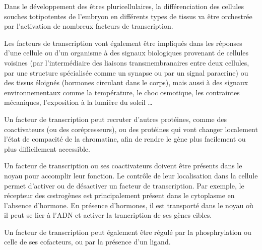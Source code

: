 \documentclass{report}
\begin{document}
Dans le développement des êtres pluricellulaires, la différenciation des cellules souches totipotentes de l'embryon en différents types de tissus va être orchestrée par l'activation de nombreux facteurs de transcription. 

Les facteurs de transcription vont également être impliqués dans les réponses d'une cellule ou d'un organisme à des signaux biologiques provenant de cellules voisines (par l'intermédiaire des liaisons transmembranaires entre deux cellules, par une structure spécialisée comme un synapse ou par un signal paracrine) ou des tissus éloignés (hormones circulant dans le corps), mais aussi à des signaux environnementaux comme la température, le choc osmotique, les contraintes mécaniques, l'exposition à la lumière du soleil  \dots


Un facteur de transcription peut recruter d'autres protéines, comme des coactivateurs (ou des corépresseurs), ou des protéines qui vont changer localement l'état de compacité de la chromatine, afin de rendre le gène plus facilement ou plus difficilement accessible. 

Un facteur de transcription ou ses coactivateurs doivent être présents dans le noyau pour accomplir leur fonction. Le contrôle de leur localisation dans la cellule permet d'activer ou de désactiver un facteur de transcription. Par exemple, le récepteur des \oe strogènes est principalement présent dans le cytoplasme en l'absence d'hormone. En présence d'hormones, il est transporté dans le noyau où il peut se lier à l'ADN et activer la trancription de ses gènes cibles. 


Un facteur de transcription peut également être régulé par la phosphrylation ou celle de ses cofacteurs, ou par la présence d'un ligand. 
\end{document}
